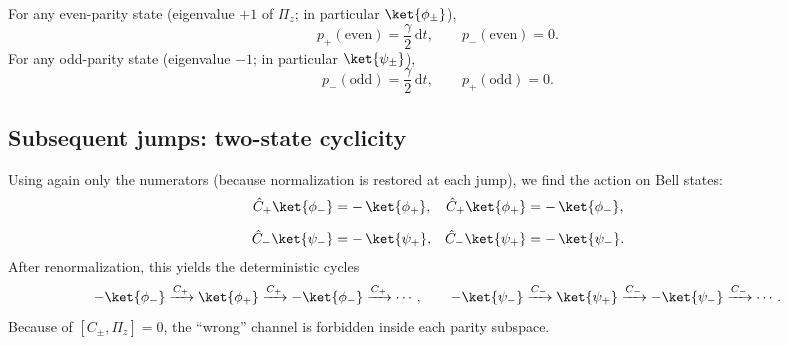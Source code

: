 For any even-parity state (eigenvalue \(+1\) of \(\Pi_z\); in particular \(\ket{\phi_\pm}\)),
\begin{equation}
	p_+(\text{even})=\frac{\gamma}{2}\,\mathrm{d}t,\qquad p_-(\text{even})=0.
\end{equation}
For any odd-parity state (eigenvalue \(-1\); in particular \(\ket{\psi_\pm}\)),
\begin{equation}
	p_-(\text{odd})=\frac{\gamma}{2}\,\mathrm{d}t,\qquad p_+(\text{odd})=0.
\end{equation}

\subsection{Subsequent jumps: two-state cyclicity}
Using again only the numerators (because normalization is restored at each jump), we find the action on Bell states:
\begin{align}
	\hat{C}_+\ket{\phi_-}
	&=-\,\ket{\phi_+},&
	\hat{C}_+\ket{\phi_+}
	&=-\,\ket{\phi_-},\\[2mm]
	\hat{C}_-\ket{\psi_-}
	&=-\,\ket{\psi_+},&
	\hat{C}_-\ket{\psi_+}
	&=-\,\ket{\psi_-}.
\end{align}
After renormalization, this yields the deterministic cycles
\begin{equation}
	-\ket{\phi_-}\xrightarrow{C_+}\ket{\phi_+}\xrightarrow{C_+}-\ket{\phi_-}\xrightarrow{C_+}\cdots,
	\qquad
	-\ket{\psi_-}\xrightarrow{C_-}\ket{\psi_+}\xrightarrow{C_-}-\ket{\psi_-}\xrightarrow{C_-}\cdots.
	\label{eq:cycles}
\end{equation}
Because of $[C_\pm,\Pi_z]=0$, the ``wrong'' channel is forbidden inside each parity subspace.

